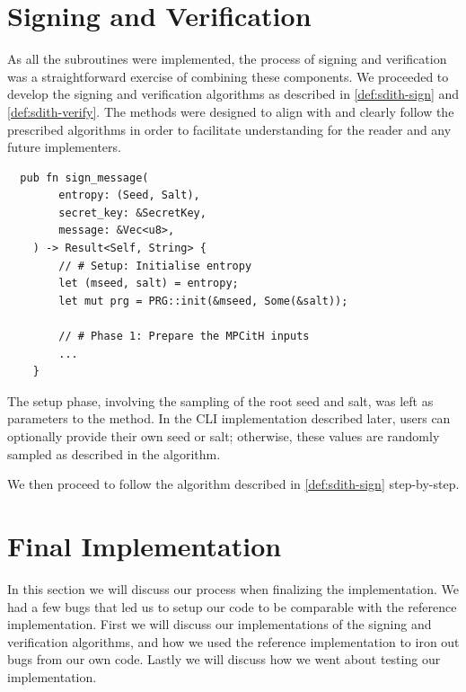 \documentclass[11pt]{report}
\theoremstyle{definition}
\theoremstyle{plain}
\begin{document}
\section{Signing and Verification}\label{sub:signing_verification}
As all the subroutines were implemented, the process of signing and verification was a straightforward exercise of combining these components. We proceeded to develop the signing and verification algorithms as described in \autoref{def:sdith-sign} and \autoref{def:sdith-verify}. The methods were designed to align with and clearly follow the prescribed algorithms in order to facilitate understanding for the reader and any future implementers.

\begin{verbatim}
  pub fn sign_message(
        entropy: (Seed, Salt),
        secret_key: &SecretKey,
        message: &Vec<u8>,
    ) -> Result<Self, String> {
        // # Setup: Initialise entropy
        let (mseed, salt) = entropy;
        let mut prg = PRG::init(&mseed, Some(&salt));

        // # Phase 1: Prepare the MPCitH inputs
        ...
    }
\end{verbatim}

The setup phase, involving the sampling of the root seed and salt, was left as parameters to the method. In the CLI implementation described later, users can optionally provide their own seed or salt; otherwise, these values are randomly sampled as described in the algorithm.

We then proceed to follow the algorithm described in \autoref{def:sdith-sign} step-by-step.

\section{Final Implementation}\label{sub:final}
In this section we will discuss our process when finalizing the implementation. We had a few bugs that led us to setup our code to be comparable with the reference implementation. First we will discuss our implementations of the signing and verification algorithms, and how we used the reference implementation to iron out bugs from our own code. Lastly we will discuss how we went about testing our implementation.
\end{document}
